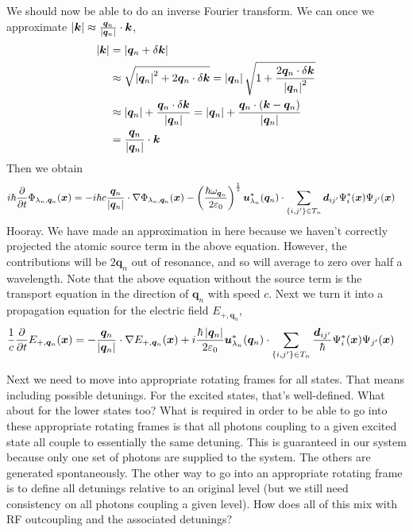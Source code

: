 We should now be able to do an inverse Fourier transform. We can once we approximate $\left|\bm{k}\right| \approx \frac{\bm{q}_n}{\left|\bm{q}_n\right|} \cdot \bm{k}$,
\begin{align}
    \left|\bm{k}\right| &= \left|\bm{q}_n + \delta \bm{k}\right|\\
    &\approx \sqrt{\left|\bm{q}_n\right|^2 + 2 \bm{q}_n \cdot \delta \bm{k}} = \left|\bm{q}_n\right| \sqrt{1 + \frac{2 \bm{q}_n \cdot \delta \bm{k}}{\left|\bm{q}_n\right|^2}}\\
    &\approx \left|\bm{q}_n\right| + \frac{\bm{q}_n \cdot \delta \bm{k}}{\left|\bm{q}_n\right|} = \left|\bm{q}_n\right| + \frac{\bm{q}_n \cdot \left(\bm{k} - \bm{q}_n\right)}{\left|\bm{q}_n\right|}\\
    &= \frac{\bm{q}_n}{\left|\bm{q}_n\right|} \cdot \bm{k}
\end{align}
 Then we obtain
\begin{align}
    i \hbar \frac{\partial}{\partial t} \Phi_{\lambda_n, \bm{q}_n}(\bm{x}) &= -i \hbar c \frac{\bm{q}_n}{\left|\bm{q}_n\right|} \cdot \nabla \Phi_{\lambda_n, \bm{q}_n}(\bm{x}) - \left(\frac{\hbar \omega_{\bm{q}_n}}{2\varepsilon_0}\right)^{\frac{1}{2}} \bm{u}_{\lambda_n}^*(\bm{q}_n) \cdot \sum_{\{i,j'\} \in T_n} \bm{d}_{ij'} \Psi^*_i(\bm{x}) \Psi_{j'}(\bm{x})
\end{align}
Hooray.  We have made an approximation in here because we haven't correctly projected the atomic source term in the above equation.  However, the contributions will be $2 \bm{q}_n$ out of resonance, and so will average to zero over half a wavelength. Note that the above equation without the source term is the transport equation in the direction of ${\bm{q}_n}$ with speed $c$.  Next we turn it into a propagation equation for the electric field ${E}_{+,\bm{q}_n}$,
\begin{align}
    \frac{1}{c} \frac{\partial}{\partial t} E_{+, \bm{q}_n} (\bm{x}) &= - \frac{\bm{q}_n}{\left|\bm{q}_n\right|} \cdot \nabla E_{+, \bm{q}_n}(\bm{x}) + i \frac{\hbar \left|\bm{q}_n\right|}{2 \varepsilon_0} \bm{u}^*_{\lambda_n}(\bm{q}_n) \cdot \sum_{\{i,j'\}\in T_n} \frac{\bm{d}_{ij'}}{\hbar} \Psi^*_i(\bm{x}) \Psi_{j'}(\bm{x})
\end{align}

Next we need to move into appropriate rotating frames for all states.  That means including possible detunings. For the excited states, that's well-defined.  What about for the lower states too?  What is required in order to be able to go into these appropriate rotating frames is that all photons coupling to a given excited state all couple to essentially the same detuning.  This is guaranteed in our system because only one set of photons are supplied to the system.  The others are generated spontaneously.  The other way to go into an appropriate rotating frame is to define all detunings relative to an original level (but we still need consistency on all photons coupling a given level).  How does all of this mix with RF outcoupling and the associated detunings?

